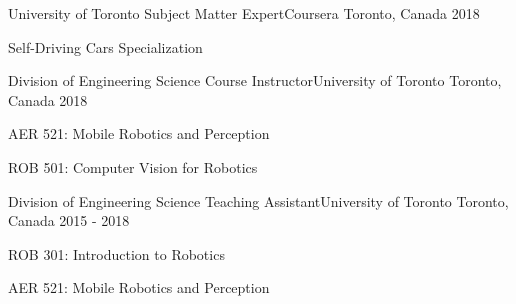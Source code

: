 

\begin{cventries}

  \cventry
    {University of Toronto} %
    {Subject Matter Expert{\enskip\cdotp\enskip}Coursera} %
    {Toronto, Canada} %
    {2018} %
    {
      \begin{cvitems} %
        \item {Self-Driving Cars Specialization}
      \end{cvitems}
    }
    
  \cventry
    {Division of Engineering Science} %
    {Course Instructor{\enskip\cdotp\enskip}University of Toronto} %
    {Toronto, Canada} %
    {2018} %
    {
      \begin{cvitems} %
        \item {AER 521: Mobile Robotics and Perception}
        \item {ROB 501: Computer Vision for Robotics}
      \end{cvitems}
    }

    \cventry
    {Division of Engineering Science} %
    {Teaching Assistant{\enskip\cdotp\enskip}University of Toronto} %
    {Toronto, Canada} %
    {2015 - 2018} %
    {
      \begin{cvitems} %
        \item {ROB 301: Introduction to Robotics}
        \item {AER 521: Mobile Robotics and Perception}
      \end{cvitems}
    }

\end{cventries}
